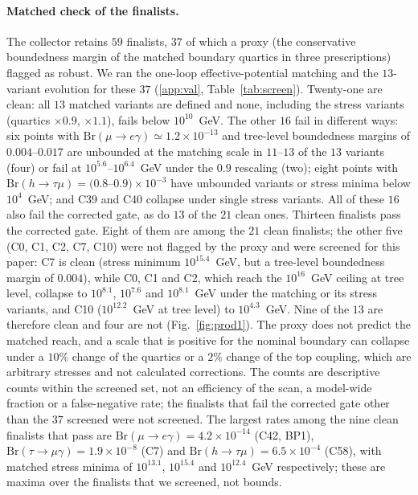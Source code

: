 \documentclass[twocolumn,epjc3]{svjour3}
\newcommand{\Br}{\mathrm{Br}}
\begin{document}
\paragraph{Matched check of the finalists.} The collector retains $59$ finalists, $37$ of which a proxy (the conservative boundedness margin of the matched boundary quartics in three prescriptions) flagged as robust. We ran the one-loop effective-potential matching and the $13$-variant evolution for these $37$ (\ref{app:val}, Table~\ref{tab:screen}). Twenty-one are clean: all $13$ matched variants are defined and none, including the stress variants (quartics $\times0.9$, $\times1.1$), fails below $10^{10}$~GeV. The other $16$ fail in different ways: six points with $\Br(\mu\to e\gamma)\simeq1.2\times10^{-13}$ and tree-level boundedness margins of $0.004$--$0.017$ are unbounded at the matching scale in $11$--$13$ of the $13$ variants (four) or fail at $10^{5.6}$--$10^{6.4}$~GeV under the $0.9$ rescaling (two); eight points with $\Br(h\to\tau\mu)=(0.8$--$0.9)\times10^{-3}$ have unbounded variants or stress minima below $10^{4}$~GeV; and C39 and C40 collapse under single stress variants. All of these $16$ also fail the corrected gate, as do $13$ of the $21$ clean ones. Thirteen finalists pass the corrected gate. Eight of them are among the $21$ clean finalists; the other five (C0, C1, C2, C7, C10) were not flagged by the proxy and were screened for this paper: C7 is clean (stress minimum $10^{15.4}$~GeV, but a tree-level boundedness margin of $0.004$), while C0, C1 and C2, which reach the $10^{16}$~GeV ceiling at tree level, collapse to $10^{8.1}$, $10^{7.6}$ and $10^{8.1}$~GeV under the matching or its stress variants, and C10 ($10^{12.2}$~GeV at tree level) to $10^{4.3}$~GeV. Nine of the $13$ are therefore clean and four are not (Fig.~\ref{fig:prod1}). The proxy does not predict the matched reach, and a scale that is positive for the nominal boundary can collapse under a $10\%$ change of the quartics or a $2\%$ change of the top coupling, which are arbitrary stresses and not calculated corrections. The counts are descriptive counts within the screened set, not an efficiency of the scan, a model-wide fraction or a false-negative rate; the finalists that fail the corrected gate other than the $37$ screened were not screened. The largest rates among the nine clean finalists that pass are $\Br(\mu\to e\gamma)=4.2\times10^{-14}$ (C42, BP1), $\Br(\tau\to\mu\gamma)=1.9\times10^{-8}$ (C7) and $\Br(h\to\tau\mu)=6.5\times10^{-4}$ (C58), with matched stress minima of $10^{13.1}$, $10^{15.4}$ and $10^{12.4}$~GeV respectively; these are maxima over the finalists that we screened, not bounds.
\end{document}
